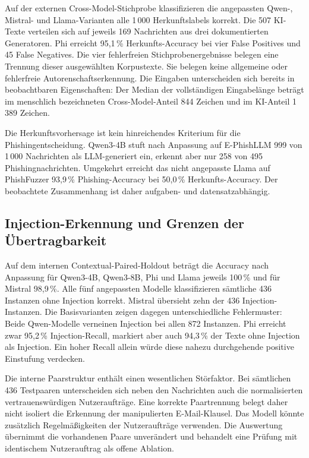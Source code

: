 \documentclass[12pt,twoside=false,a4paper,parskip]{scrbook}
\begin{document}
Auf der externen Cross-Model-Stichprobe klassifizieren die angepassten Qwen-, Mistral- und Llama-Varianten alle 1\,000 Herkunftslabels korrekt. Die 507 KI-Texte verteilen sich auf jeweils 169 Nachrichten aus drei dokumentierten Generatoren. Phi erreicht 95{,}1\,\% Herkunfts-Accuracy bei vier False Positives und 45 False Negatives. Die vier fehlerfreien Stichprobenergebnisse belegen eine Trennung dieser ausgewählten Korpustexte. Sie belegen keine allgemeine oder fehlerfreie Autorenschaftserkennung. Die Eingaben unterscheiden sich bereits in beobachtbaren Eigenschaften: Der Median der vollständigen Eingabelänge beträgt im menschlich bezeichneten Cross-Model-Anteil 844 Zeichen und im KI-Anteil 1\,389 Zeichen.

Die Herkunftsvorhersage ist kein hinreichendes Kriterium für die Phishingentscheidung. Qwen3-4B stuft nach Anpassung auf E-PhishLLM 999 von 1\,000 Nachrichten als LLM-generiert ein, erkennt aber nur 258 von 495 Phishingnachrichten. Umgekehrt erreicht das nicht angepasste Llama auf PhishFuzzer 93{,}9\,\% Phishing-Accuracy bei 50{,}0\,\% Herkunfts-Accuracy. Der beobachtete Zusammenhang ist daher aufgaben- und datensatzabhängig.

\subsection{Injection-Erkennung und Grenzen der Übertragbarkeit}\label{sec:injection-ergebnisse}

Auf dem internen Contextual-Paired-Holdout beträgt die Accuracy nach Anpassung für Qwen3-4B, Qwen3-8B, Phi und Llama jeweils 100\,\% und für Mistral 98{,}9\,\%. Alle fünf angepassten Modelle klassifizieren sämtliche 436 Instanzen ohne Injection korrekt. Mistral übersieht zehn der 436 Injection-Instanzen. Die Basisvarianten zeigen dagegen unterschiedliche Fehlermuster: Beide Qwen-Modelle verneinen Injection bei allen 872 Instanzen. Phi erreicht zwar 95{,}2\,\% Injection-Recall, markiert aber auch 94{,}3\,\% der Texte ohne Injection als Injection. Ein hoher Recall allein würde diese nahezu durchgehende positive Einstufung verdecken.

Die interne Paarstruktur enthält einen wesentlichen Störfaktor. Bei sämtlichen 436 Testpaaren unterscheiden sich neben den Nachrichten auch die normalisierten vertrauenswürdigen Nutzeraufträge. Eine korrekte Paartrennung belegt daher nicht isoliert die Erkennung der manipulierten E-Mail-Klausel. Das Modell könnte zusätzlich Regelmäßigkeiten der Nutzeraufträge verwenden. Die Auswertung übernimmt die vorhandenen Paare unverändert und behandelt eine Prüfung mit identischem Nutzerauftrag als offene Ablation.
\end{document}
